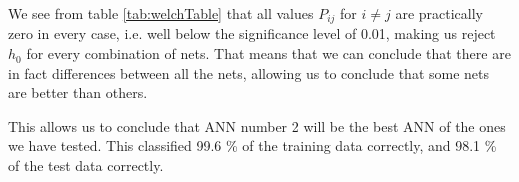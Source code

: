 \documentclass[11pt,a4paper]{article}
\begin{document}
We see from table \ref{tab:welchTable} that all values $P_{ij}$ for $i \neq j$ are practically zero in every case, i.e. well below the significance level of 0.01, making us reject $h_0$ for every combination of nets. That means that we can conclude that there are in fact differences between all the nets, allowing us to conclude that some nets are better than others.

This allows us to conclude that ANN number 2 will be the best ANN of the ones we have tested. This classified 99.6 \% of the training data correctly, and 98.1 \% of the test data correctly.
\end{document}
